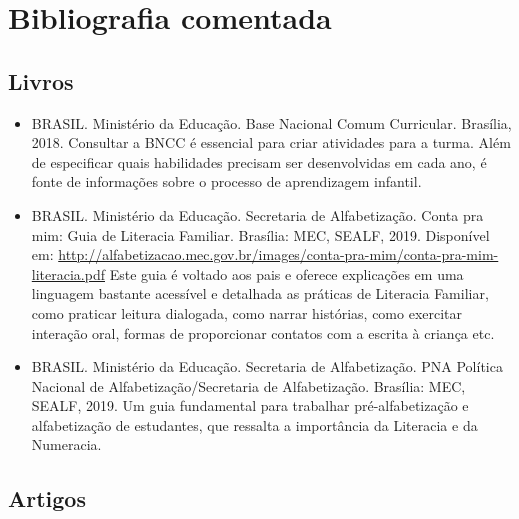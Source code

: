 \documentclass[11pt]{extarticle}
\begin{document}
\section{Bibliografia comentada}

\subsection{Livros}

\begin{itemize}
\item BRASIL. Ministério da Educação. Base Nacional Comum Curricular. Brasília, 2018.
Consultar a BNCC é essencial para criar atividades para a turma. Além de especificar 
quais habilidades precisam ser desenvolvidas em cada ano, é fonte de informações sobre 
o processo de aprendizagem infantil. 

\item BRASIL. Ministério da Educação. Secretaria de Alfabetização. Conta pra mim: Guia de Literacia Familiar. 
Brasília: MEC, SEALF, 2019. Disponível em: \url{http://alfabetizacao.mec.gov.br/images/conta-pra-mim/conta-pra-mim-literacia.pdf}
Este guia é voltado aos pais e oferece explicações em uma linguagem bastante acessível e detalhada as práticas de Literacia Familiar, 
como praticar leitura dialogada, como narrar histórias, como exercitar interação oral, formas de proporcionar contatos com a escrita à criança etc. 
 
\item BRASIL. Ministério da Educação. Secretaria de Alfabetização. PNA Política Nacional de Alfabetização/Secretaria 
de Alfabetização. Brasília: MEC, SEALF, 2019.
Um guia fundamental para trabalhar pré-alfabetização e alfabetização de estudantes, que ressalta a importância da Literacia e da Numeracia. 


\end{itemize}

\subsection{Artigos}
\end{document}
